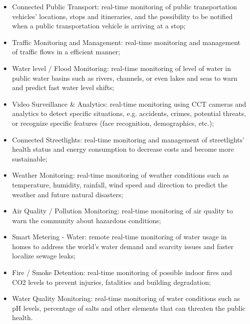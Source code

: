 \begin{itemize}
    \item Connected Public Transport: real-time monitoring of public transportation vehicles' locations, stops and itineraries, and the possibility to be notified when a public transportation vehicle is arriving at a stop;
    \item Traffic Monitoring and Management: real-time monitoring and management of traffic flows in a efficient manner;
    \item Water level / Flood Monitoring: real-time monitoring of level of water in public water basins such as rivers, channels, or even lakes and seas to warn and predict fast water level shifts;
    \item Video Surveillance \& Analytics: real-time monitoring using \gls{CCT} cameras and analytics to detect specific situations, e.g. accidents, crimes, potential threats, or recognize specific features (face recognition, demographics, etc.);
    \item Connected Streetlights: real-time monitoring and management of streetlights' health status and energy consumption to decrease costs and become more sustainable;
    \item Weather Monitoring: real-time monitoring of weather conditions such as temperature, humidity, rainfall, wind speed and direction to predict the weather and future natural disasters;
    \item Air Quality / Pollution Monitoring: real-time monitoring of air quality to warn the community about hazardous conditions;
    \item Smart Metering - Water: remote real-time monitoring of water usage in homes to address the world’s water demand and scarcity issues and faster localize sewage leaks;
    \item Fire / Smoke Detention: real-time monitoring of possible indoor fires and CO2 levels to prevent injuries, fatalities and building degradation;
    \item Water Quality Monitoring: real-time monitoring of water conditions such as pH levels, percentage of salts and other elements that can threaten the public health.
\end{itemize}

